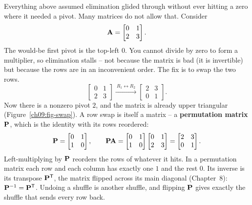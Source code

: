 Everything above assumed elimination glided through without ever hitting a zero where it
needed a pivot. Many matrices do not allow that. Consider
\[
  \mathbf{A} = \begin{bmatrix} 0 & 1 \\ 2 & 3 \end{bmatrix}.
\]
The would-be first pivot is the top-left $0$. You cannot divide by zero to form a
multiplier, so elimination stalls -- not because the matrix is bad (it is invertible) but
because the rows are in an inconvenient order. The fix is to swap the two rows.
\[
  \begin{bmatrix} 0 & 1 \\ 2 & 3 \end{bmatrix}
  \xrightarrow{\ R_1 \leftrightarrow R_2\ }
  \begin{bmatrix} 2 & 3 \\ 0 & 1 \end{bmatrix}.
\]
Now there is a nonzero pivot $2$, and the matrix is already upper triangular
(Figure~\ref{ch09:fig-swap}). A row swap is
itself a matrix -- a \textbf{permutation matrix} $\mathbf{P}$, which is the identity with its
rows reordered:
\[
  \mathbf{P} = \begin{bmatrix} 0 & 1 \\ 1 & 0 \end{bmatrix},
  \qquad
  \mathbf{P}\mathbf{A} = \begin{bmatrix} 0&1\\1&0 \end{bmatrix}\begin{bmatrix} 0&1\\2&3 \end{bmatrix}
  = \begin{bmatrix} 2 & 3 \\ 0 & 1 \end{bmatrix}.
\]
Left-multiplying by $\mathbf{P}$ reorders the rows of whatever it hits. In a permutation matrix
each row and each column has exactly one $1$ and the rest $0$. Its inverse is its
transpose $\mathbf{P}^{\mathsf{T}}$, the matrix flipped across its main diagonal (Chapter~8): $\mathbf{P}^{-1} = \mathbf{P}^{\mathsf{T}}$. Undoing a shuffle is another shuffle, and flipping
$\mathbf{P}$ gives exactly the shuffle that sends every row back.

